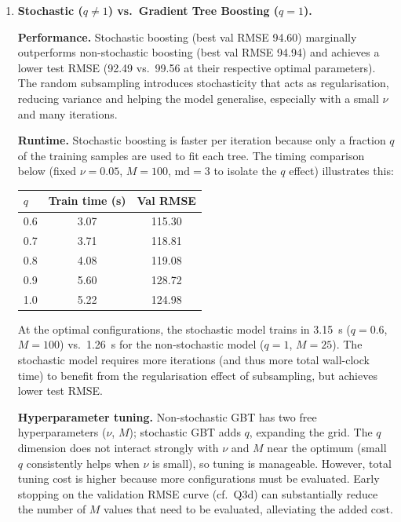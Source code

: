 \documentclass[a4paper,12pt]{article}
\begin{document}
\begin{enumerate}
\begin{enumerate}[label=(\alph*)]
The optimal stochastic SGTB achieves a test RMSE of \textbf{92.49}, which is a
$\approx$7.7\% improvement over Ridge and $\approx$3.9\% over Lasso from Homework~\#1.
This is expected: boosted trees capture non-linear relationships between the sensor
readings and energy consumption that linear models cannot represent.
Even the non-stochastic variant ($q=1$) matches or slightly exceeds Lasso (99.56 vs.\
96.22) depending on the chosen $(\nu, M)$; with more careful tuning (e.g., smaller $\nu$
and more iterations) it would likely surpass it as well.

\item \textbf{Stochastic ($q \neq 1$) vs.\ Gradient Tree Boosting ($q=1$).}

\textbf{Performance.} Stochastic boosting (best val RMSE 94.60) marginally outperforms
non-stochastic boosting (best val RMSE 94.94) and achieves a lower test RMSE (92.49 vs.\
99.56 at their respective optimal parameters). The random subsampling introduces
stochasticity that acts as regularisation, reducing variance and helping the model
generalise, especially with a small $\nu$ and many iterations.

\textbf{Runtime.} Stochastic boosting is faster per iteration because only a fraction
$q$ of the training samples are used to fit each tree. The timing comparison below
(fixed $\nu=0.05$, $M=100$, $\mathrm{md}=3$ to isolate the $q$ effect) illustrates this:

\begin{center}
\begin{tabular}{lcc}
\toprule
$q$ & Train time (s) & Val RMSE \\
\midrule
0.6 & 3.07 & 115.30 \\
0.7 & 3.71 & 118.81 \\
0.8 & 4.08 & 119.08 \\
0.9 & 5.60 & 128.72 \\
1.0 & 5.22 & 124.98 \\
\bottomrule
\end{tabular}
\end{center}

At the optimal configurations, the stochastic model trains in 3.15~s ($q=0.6$,
$M=100$) vs.\ 1.26~s for the non-stochastic model ($q=1$, $M=25$). The stochastic
model requires more iterations (and thus more total wall-clock time) to benefit from the
regularisation effect of subsampling, but achieves lower test RMSE.

\textbf{Hyperparameter tuning.} Non-stochastic GBT has two free hyperparameters
($\nu$, $M$); stochastic GBT adds $q$, expanding the grid. The $q$ dimension does not
interact strongly with $\nu$ and $M$ near the optimum (small $q$ consistently helps when
$\nu$ is small), so tuning is manageable. However, total tuning cost is higher because
more configurations must be evaluated. Early stopping on the validation RMSE
curve (cf.~Q3d) can substantially reduce the number of $M$ values that need to be
evaluated, alleviating the added cost.

\end{enumerate}

\end{enumerate}
\end{document}
